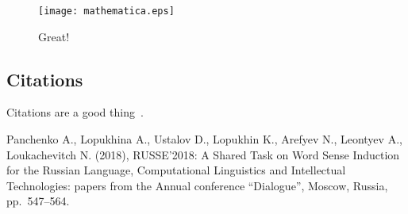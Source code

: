 \documentclass[a4paper]{article}
\begin{document}
\begin{figure}[htbp]
\centering
\texttt{[image: mathematica.eps]}
\caption{\label{fig:example}Great!}
\end{figure}

\subsection{Citations}

Citations are a good thing~\cite{RUSSE2018}.

\begin{thebibliography}{1}

Panchenko A., Lopukhina A., Ustalov D., Lopukhin K., Arefyev N., Leontyev A., Loukachevitch N. (2018), RUSSE'2018: A Shared Task on Word Sense Induction for the Russian Language, Computational Linguistics and Intellectual Technologies: papers from the Annual conference ``Dialogue'', Moscow, Russia, pp.~547--564.

\end{thebibliography}
\end{document}
